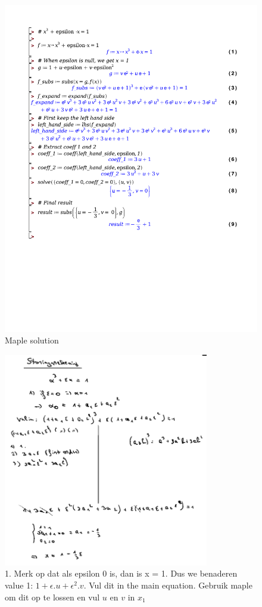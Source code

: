 \documentclass[a4paper]{article}
\begin{document}
\begin{figure}[!htbp]
	\centering
	\includegraphics[width=\textwidth]{./storing.pdf}
	\caption{Maple solution}
	\label{sol:storing}
\end{figure}

\begin{figure}[htbp!]
	\centering
	\includegraphics[width=0.8\textwidth]{assets/storing_solution.png}
	\caption{1. Merk op dat als epsilon 0 is, dan is x = 1. Dus we benaderen value 1: $1 + \epsilon . u + \epsilon^2 . v$. Vul dit in the main equation. Gebruik maple om dit op te lossen en vul $u$ en $v$ in $x_1$}
	\label{fig:storing_solution}
\end{figure}
\end{document}
